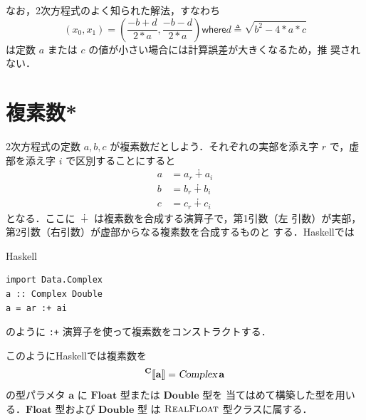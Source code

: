 \documentclass[a5paper,twoside,fleqn,draft]{jsbook}
\def\[{[\![}
\def\]{]\!]}
\newcommand{\programminglanguage}[1]{\textsf{#1}}
\newcommand{\haskell}{\programminglanguage{Haskell}}
\newcommand{\code}[1]{\texttt{#1}}
\newenvironment{haskellcode}{\begin{itembox}[r]{\haskell}}{\end{itembox}}
\newcommand{\mKeyword}[1]{\mathsf{#1}}
\newcommand{\mWhereKeyword}{\mKeyword{where}}
\DeclareMathOperator{\mComplexPlus}{\dotplus}
\DeclareMathOperator{\mLetEq}{\triangleq}
\newcommand{\mType}[1]{\mathbf{#1}} %
\newcommand{\mA}{\mType{a}}
\newcommand{\mFloatType}{\mType{Float}}
\newcommand{\mDoubleType}{\mType{Double}}
\newcommand{\mTypeAssemble}[2]{{}^\mType{#1}\[\mType{#2}\]}
\newcommand{\mComplexType}[1]{\mTypeAssemble{C}{#1}}
\newcommand{\mTypeConstructor}[1]{\textsl{#1}}
\newcommand{\mTypeClass}[1]{\textsc{#1}} %
\newcommand{\mRealFloatTypeClass}{\mTypeClass{RealFloat}}
\newcommand{\mWhereIsEXP}[2]{\mathbin{\mWhereKeyword}#1\mLetEq#2} %
\begin{document}
なお，2次方程式のよく知られた解法，すなわち
\begin{equation}
  (x_0,x_1)=\left(\frac{-b+d}{2*a},\frac{-b-d}{2*a}\right)
  \mWhereIsEXP{d}{\sqrt{b^2-4*a*c}}
\end{equation}
は定数 $a$ または $c$ の値が小さい場合には計算誤差が大きくなるため，推
奨されない．

\section{複素数*}


2次方程式の定数 $a,b,c$ が複素数だとしよう．それぞれの実部を添え字 $r$
で，虚部を添え字 $i$ で区別することにすると
\begin{align}
a&=a_r\mComplexPlus a_i\\
b&=b_r\mComplexPlus b_i\\
c&=c_r\mComplexPlus c_i
\end{align}
となる．ここに $\mComplexPlus$ は複素数を合成する演算子で，第1引数（左
  引数）が実部，第2引数（右引数）が虚部からなる複素数を合成するものと
する．\haskell では
\begin{haskellcode}
\begin{verbatim}
import Data.Complex
a :: Complex Double
a = ar :+ ai
\end{verbatim}
\end{haskellcode}
のように \code{:+} 演算子を使って複素数をコンストラクトする．

このように\haskell では複素数を
\begin{equation}
  \mComplexType{a}=\mathop{\mTypeConstructor{Complex}}\mA
\end{equation}
の型パラメタ $\mA $ に $\mFloatType$ 型または $\mDoubleType$ 型を
当てはめて構築した型を用いる．$\mFloatType$ 型および $\mDoubleType$ 型
は $\mRealFloatTypeClass$ 型クラスに属する．
\end{document}
